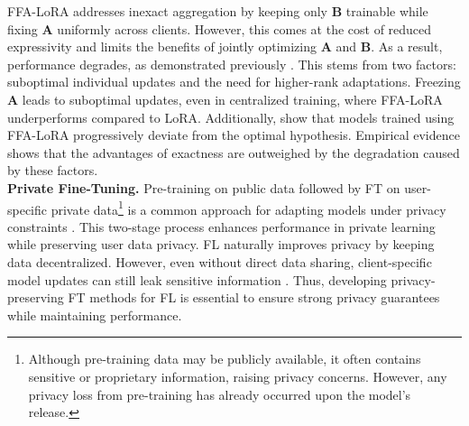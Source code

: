 FFA-LoRA addresses inexact aggregation by keeping only \( \mathbf{B} \) trainable while fixing \( \mathbf{A} \) uniformly across clients.  
However, this comes at the cost of reduced expressivity and limits the benefits of jointly optimizing \( \mathbf{A} \) and \( \mathbf{B} \).  
As a result, performance degrades, as demonstrated previously \citep{singhal2024exact}.  
This stems from two factors: suboptimal individual updates and the need for higher-rank adaptations.  
Freezing \( \mathbf{A} \) leads to suboptimal updates, even in centralized training, where FFA-LoRA underperforms compared to LoRA.  
Additionally, \citet{mahla2025exploringgradientsubspacesaddressing} show that models trained using FFA-LoRA progressively deviate from the optimal hypothesis.  
Empirical evidence shows that the advantages of exactness are outweighed by the degradation caused by these factors.
\\

\textbf{Private Fine-Tuning.} 
Pre-training on public data followed by FT on user-specific private data\footnote{Although pre-training data may be publicly available, it often contains sensitive or proprietary information, raising privacy concerns. However, any privacy loss from pre-training has already occurred upon the model’s release.} is a common approach for adapting models under privacy constraints \citep{yu2021differentially, tang2024private}.  
This two-stage process enhances performance in private learning while preserving user data privacy.  
FL naturally improves privacy by keeping data decentralized. 
However, even without direct data sharing, client-specific model updates can still leak sensitive information \citep{truong2021privacy}.  
Thus, developing privacy-preserving FT methods for FL is essential to ensure strong privacy guarantees while maintaining performance.


